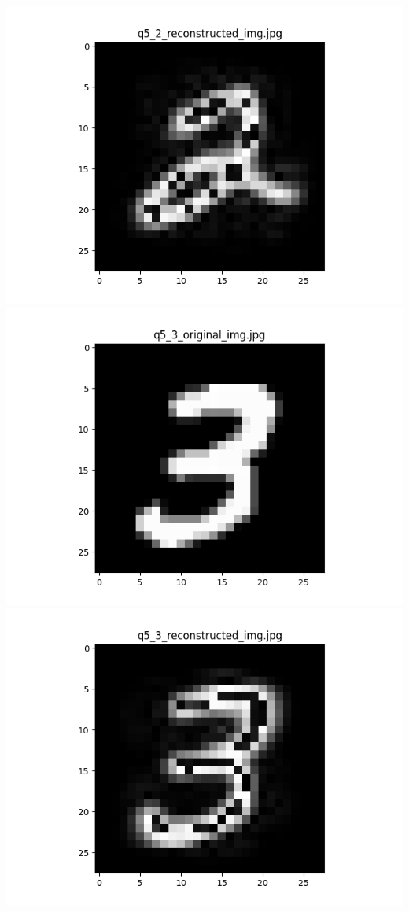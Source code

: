 \documentclass{article}
\begin{document}
    \includegraphics[scale=.6]{../results/q5/reconstrcuted/q5_2_reconstructed.png}
    \\
    \includegraphics[scale=.6]{../results/q5/original/q5_3_original.png}
    \includegraphics[scale=.6]{../results/q5/reconstrcuted/q5_3_reconstructed.png}
\end{document}
